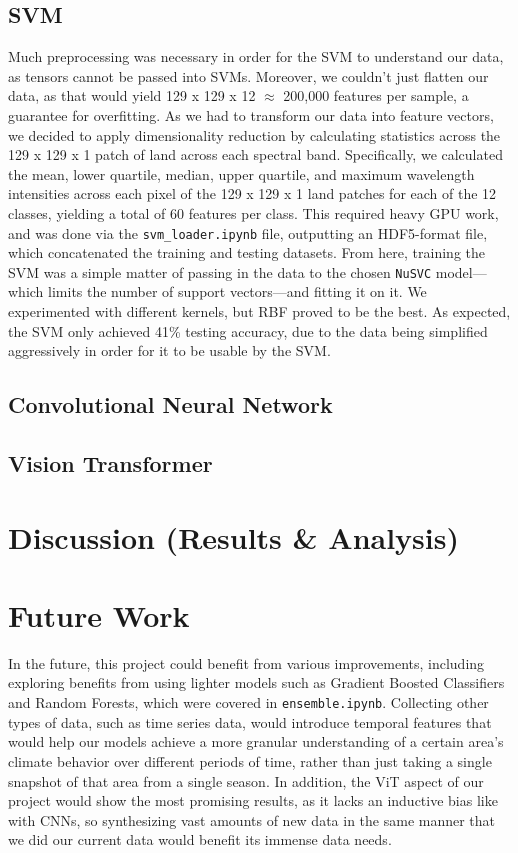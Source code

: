 \documentclass[12pt]{article}
\begin{document}
\subsection{SVM}
\label{subsec:svm-architecture}
Much preprocessing was necessary in order for the SVM to understand our data, as tensors cannot be passed into SVMs. Moreover, we couldn't just flatten our data, as that would yield 129 x 129 x 12 $\approx$ 200,000 features per sample, a guarantee for overfitting. As we had to transform our data into feature vectors, we decided to apply dimensionality reduction by calculating statistics across the 129 x 129 x 1 patch of land across each spectral band. Specifically, we calculated the mean, lower quartile, median, upper quartile, and maximum wavelength intensities across each pixel of the 129 x 129 x 1 land patches for each of the 12 classes, yielding a total of 60 features per class. This required heavy GPU work, and was done via the \texttt{svm\_loader.ipynb} file, outputting an HDF5-format file, which concatenated the training and testing datasets. From here, training the SVM was a simple matter of passing in the data to the chosen \texttt{NuSVC} model—which limits the number of support vectors—and fitting it on it. We experimented with different kernels, but RBF proved to be the best. As expected, the SVM only achieved 41\% testing accuracy, due to the data being simplified aggressively in order for it to be usable by the SVM.

\subsection{Convolutional Neural Network}
\label{subsec:cnn-architecture}

\subsection{Vision Transformer}
\label{subsec:vit-architecture}

\section{Discussion (Results \& Analysis)}
\label{sec:results-analysis}

\section{Future Work}
\label{sec:future-work}
In the future, this project could benefit from various improvements, including exploring benefits from using lighter models such as Gradient Boosted Classifiers and Random Forests, which were covered in \texttt{ensemble.ipynb}. Collecting other types of data, such as time series data, would introduce temporal features that would help our models achieve a more granular understanding of a certain area's climate behavior over different periods of time, rather than just taking a single snapshot of that area from a single season. In addition, the ViT aspect of our project would show the most promising results, as it lacks an inductive bias like with CNNs, so synthesizing vast amounts of new data in the same manner that we did our current data would benefit its immense data needs.

\printbibliography
\end{document}
